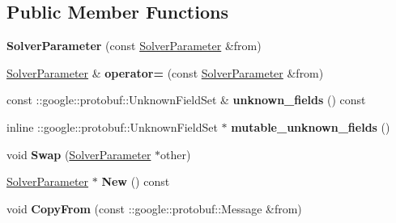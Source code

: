 \subsection*{Public Member Functions}
\begin{DoxyCompactItemize}
\item 
\mbox{\label{classcaffe_1_1_solver_parameter_a6bd1670742a6a93ca340afd8b9777c7c}} 
{\bfseries Solver\+Parameter} (const \mbox{\hyperlink{classcaffe_1_1_solver_parameter}{Solver\+Parameter}} \&from)
\item 
\mbox{\label{classcaffe_1_1_solver_parameter_a2a03c2c9244d2910378edde1a555ef43}} 
\mbox{\hyperlink{classcaffe_1_1_solver_parameter}{Solver\+Parameter}} \& {\bfseries operator=} (const \mbox{\hyperlink{classcaffe_1_1_solver_parameter}{Solver\+Parameter}} \&from)
\item 
\mbox{\label{classcaffe_1_1_solver_parameter_a2aa0d230fdb1a9bd1655715c972c4d52}} 
const \+::google\+::protobuf\+::\+Unknown\+Field\+Set \& {\bfseries unknown\+\_\+fields} () const
\item 
\mbox{\label{classcaffe_1_1_solver_parameter_a11f5d8d40e1d52ea3b09311afb84291d}} 
inline \+::google\+::protobuf\+::\+Unknown\+Field\+Set $\ast$ {\bfseries mutable\+\_\+unknown\+\_\+fields} ()
\item 
\mbox{\label{classcaffe_1_1_solver_parameter_a64ceedef33d70d99e0cb23f1a96f7128}} 
void {\bfseries Swap} (\mbox{\hyperlink{classcaffe_1_1_solver_parameter}{Solver\+Parameter}} $\ast$other)
\item 
\mbox{\label{classcaffe_1_1_solver_parameter_af85c643e22030c428aa69dfd67b354a0}} 
\mbox{\hyperlink{classcaffe_1_1_solver_parameter}{Solver\+Parameter}} $\ast$ {\bfseries New} () const
\item 
\mbox{\label{classcaffe_1_1_solver_parameter_aaf19baab4164373c2c978176134b123a}} 
void {\bfseries Copy\+From} (const \+::google\+::protobuf\+::\+Message \&from)
\item 
\mbox{\label{classcaffe_1_1_solver_parameter_a4609b21b4c91061360e642536b2afdd5}} 

\end{DoxyCompactItemize}
